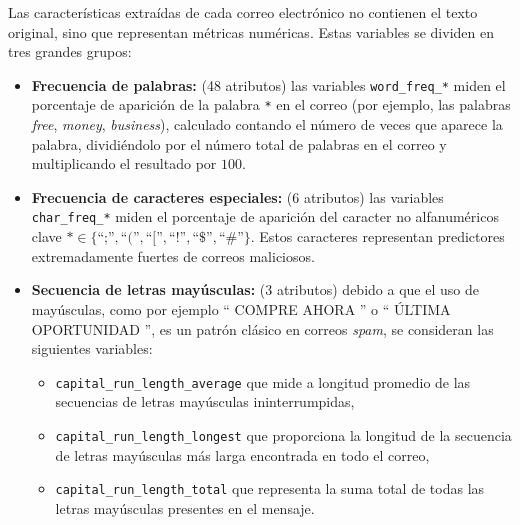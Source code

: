 \documentclass[a4paper,11pt ,openany]{book}
\begin{document}
Las características extraídas de cada correo electrónico no contienen el texto original, sino que representan métricas numéricas. Estas variables se dividen en tres grandes grupos:
\begin{itemize}
    \item \textbf{Frecuencia de palabras:} (48 atributos) las variables \texttt{word\_freq\_*} miden el porcentaje de aparición de la palabra \texttt{*} en el correo (por ejemplo, las palabras \textit{free}, \textit{money}, \textit{business}), calculado contando el número de veces que aparece la palabra, dividiéndolo por el número total de palabras en el correo y multiplicando el resultado por $100$.
    
    \item \textbf{Frecuencia de caracteres especiales:} (6 atributos) las variables \texttt{char\_freq\_*} miden el porcentaje de aparición del caracter no alfanuméricos clave $\texttt{*} \in \{\text{``;''}, \text{``(''}, \text{``[''}, \text{``!''}, \text{``\$''}, \text{``\#''} \}$. Estos caracteres representan predictores extremadamente fuertes de correos maliciosos.

    
    \item \textbf{Secuencia de letras mayúsculas:} (3 atributos) debido a que el uso de mayúsculas, como por ejemplo  ``  COMPRE AHORA '' o `` ÚLTIMA OPORTUNIDAD '', es un patrón  clásico en correos \textit{spam}, se consideran las siguientes variables:
    \begin{itemize}
        \item \texttt{capital\_run\_length\_average} que mide a longitud promedio de las secuencias de letras mayúsculas ininterrumpidas,
        \item \texttt{capital\_run\_length\_longest} que proporciona la longitud de la secuencia de letras mayúsculas más larga encontrada en todo el correo,
        \item \texttt{capital\_run\_length\_total} que representa la suma total de todas las letras mayúsculas presentes en el mensaje.
    \end{itemize}
\end{itemize}
\end{document}
